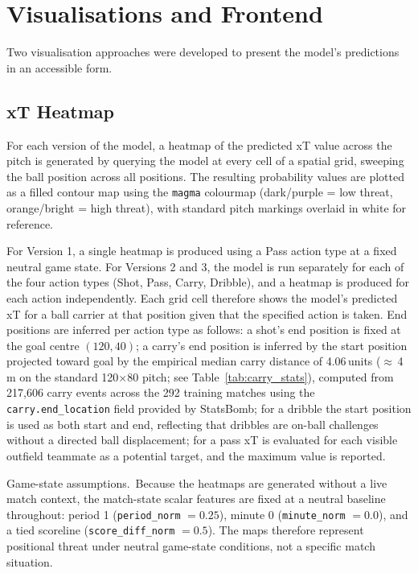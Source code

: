 \chapter{Visualisations and Frontend}\label{ch:viz}

Two visualisation approaches were developed to present the model's predictions in an accessible form.

\section{xT Heatmap}

For each version of the model, a heatmap of the predicted xT value across the pitch is generated by querying the model at every cell of a spatial grid, sweeping the ball position across all positions. The resulting probability values are plotted as a filled contour map using the \texttt{magma} colourmap (dark/purple = low threat, orange/bright = high threat), with standard pitch markings overlaid in white for reference.

For Version 1, a single heatmap is produced using a Pass action type at a fixed neutral game state. For Versions 2 and 3, the model is run separately for each of the four action types (Shot, Pass, Carry, Dribble), and a heatmap is produced for each action independently. Each grid cell therefore shows the model's predicted xT for a ball carrier at that position given that the specified action is taken. End positions are inferred per action type as follows: a shot's end position is fixed at the goal centre $(120, 40)$; a carry's end position is inferred by the start position projected toward goal by the empirical median carry distance of 4.06\,units ($\approx$\,4\,m on the standard 120$\times$80 pitch; see Table~\ref{tab:carry_stats}), computed from 217,606 carry events across the 292 training matches using the \texttt{carry.end\_location} field provided by StatsBomb; for a dribble the start position is used as both start and end, reflecting that dribbles are on-ball challenges without a directed ball displacement; for a pass xT is evaluated for each visible outfield teammate as a potential target, and the maximum value is reported.

Game-state assumptions.\ Because the heatmaps are generated without a live match context, the match-state scalar features are fixed at a neutral baseline throughout: period 1 (\texttt{period\_norm} $= 0.25$), minute 0 (\texttt{minute\_norm} $= 0.0$), and a tied scoreline (\texttt{score\_diff\_norm} $= 0.5$). The maps therefore represent positional threat under neutral game-state conditions, not a specific match situation.

